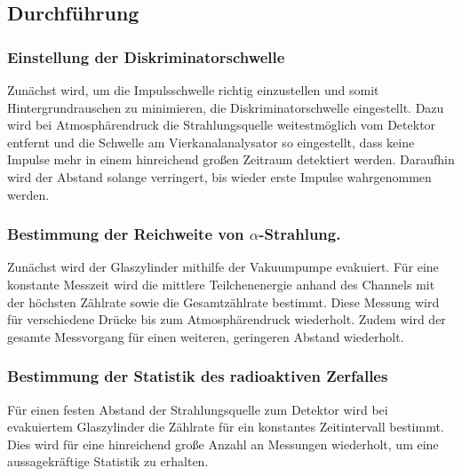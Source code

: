 \subsection{Durchführung}
\label{sec:durchführung}
\subsubsection{Einstellung der Diskriminatorschwelle}
Zunächst wird, um die Impulsschwelle richtig einzustellen und somit Hintergrundrauschen zu minimieren, die Diskriminatorschwelle eingestellt.
Dazu wird bei Atmosphärendruck die Strahlungsquelle weitestmöglich vom Detektor entfernt und die Schwelle am Vierkanalanalysator so eingestellt, dass keine Impulse mehr in einem hinreichend großen Zeitraum detektiert werden.
Daraufhin wird der Abstand solange verringert, bis wieder erste Impulse wahrgenommen werden.

\subsubsection{\texorpdfstring{Bestimmung der Reichweite von $\alpha$-Strahlung}{Bestimmung der Reichweite von Alpha-Strahlung}.}
Zunächst wird der Glaszylinder mithilfe der Vakuumpumpe evakuiert.
Für eine konstante Messzeit wird die mittlere Teilchenenergie anhand des Channels mit der höchsten Zählrate sowie die Gesamtzählrate bestimmt.
Diese Messung wird für verschiedene Drücke bis zum Atmosphärendruck wiederholt.
Zudem wird der gesamte Messvorgang für einen weiteren, geringeren Abstand wiederholt.

\subsubsection{Bestimmung der Statistik des radioaktiven Zerfalles}
Für einen festen Abstand der Strahlungsquelle zum Detektor wird bei evakuiertem Glaszylinder die Zählrate für ein  konstantes Zeitintervall bestimmt.
Dies wird für eine hinreichend große Anzahl an Messungen wiederholt, um eine aussagekräftige Statistik zu erhalten.
